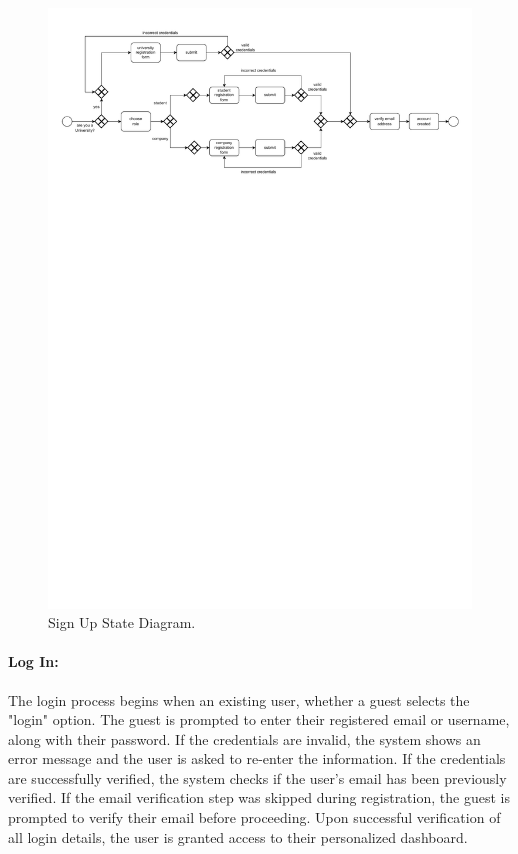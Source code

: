 \begin{figure}[H]
    \begin{center}
        \includegraphics[width=\linewidth]{Images/StateDiagram/SignUp.pdf}
        \caption{Sign Up State Diagram.}
        \label{fig:sign_up_state_diag}%
    \end{center}
\end{figure}

\paragraph{Log In:} The login process begins when an existing user,
  whether a guest selects the "login" option. The guest is prompted to
  enter their registered email or username, along with their password.
  If the credentials are invalid, the system shows an error message and
  the user is asked to re-enter the information. If the credentials are
  successfully verified, the system checks if the user's email has been
  previously verified. If the email verification step was skipped during
  registration, the guest is prompted to verify their email before
  proceeding. Upon successful verification of all login details, the
  user is granted access to their personalized dashboard.

